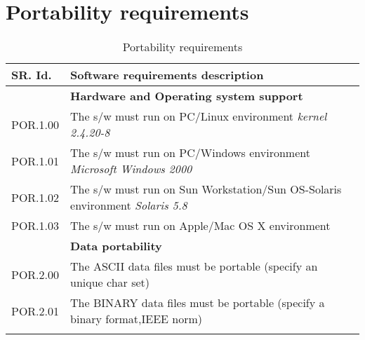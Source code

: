 \section{Portability requirements}
\begin{longtable}{%
|>{\columncolor[gray]{.8}}p{}%
|>{\columncolor[gray]{.95}}p{}|}
   \hline
\rowcolor[gray]{.8}   SR. Id. & Software requirements description \\
      \hline 
   & \textbf{  Hardware and Operating system support }\\
   \hline
   POR.1.00 & The s/w must run on PC/Linux environment \textit{kernel 2.4.20-8}\\
   POR.1.01 & The s/w must run on PC/Windows environment \textit{Microsoft Windows 2000}\\
   POR.1.02 & The s/w must run on Sun Workstation/Sun OS-Solaris environment \textit{Solaris 5.8}\\
   POR.1.03 & The s/w must run on  Apple/Mac OS X environment \\
   \hline 
   & \textbf{ Data portability}\\
   \hline
   POR.2.00 & The ASCII data files must be portable (specify an unique char set)\\ 
   POR.2.01 & The BINARY data files must be portable (specify a binary format,IEEE norm)\\ 
   \hline
\caption{Portability requirements}\\
\end{longtable}



